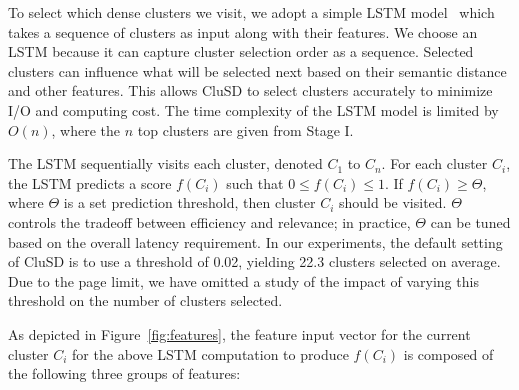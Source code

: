 To select which dense clusters we visit, we adopt a simple LSTM model~\cite{hochreiter1997long}
which takes a sequence of clusters as input along with their features. We choose an LSTM because it can 
capture cluster selection order as a sequence. Selected clusters can influence what will be selected next based on 
their semantic distance and other features. This allows CluSD to select clusters accurately to 
minimize I/O and computing cost.
The time complexity of the LSTM model is limited by $O(n)$,
where the $n$ top clusters are  given from  Stage I.

The LSTM sequentially visits each cluster, denoted $C_1$ to $C_{n}$. 
For each cluster $C_i$, the LSTM predicts a score $f(C_i)$ such that $0\leq f(C_i) \leq 1$.
If $f(C_i) \ge \Theta$, where $\Theta$ is a set prediction threshold, then cluster  $C_i$ should be visited. 
$\Theta$ controls the tradeoff between efficiency and relevance; in practice, $\Theta$ can be tuned based on the overall latency requirement.
In our experiments,  the default setting of
CluSD is to use a threshold of 0.02,
yielding 22.3 clusters selected on average. Due to the page limit, we have omitted a study of
 the impact of varying this threshold on the number of clusters selected.


As depicted in Figure~\ref{fig:features}, the feature input vector for the current cluster  $C_i$ for the above LSTM computation to produce $f(C_i)$
is composed of the following three groups of features:


